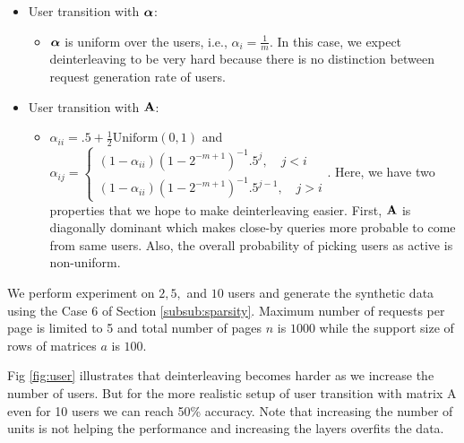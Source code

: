 	\begin{itemize}
		\item User transition with $\boldsymbol{\alpha}$:
		\begin{itemize}
			\item $\boldsymbol{\alpha}$ is uniform over the users, i.e., $\alpha_i = \frac{1}{m}$. In this case, we expect deinterleaving to be very hard because there is no distinction between request generation rate of users. 
		\end{itemize}
		\item User transition with $\mathbf{A}$:
		\begin{itemize}
			\item $\alpha_{ii} = .5 + \frac{1}{2} \text{Uniform}(0,1)$ and $\alpha_{ij} = 
			\begin{cases}
			(1 - \alpha_{ii}) (1 - 2^{-m+1})^{-1} .5^j,     \quad j < i \\
			(1 - \alpha_{ii}) (1 - 2^{-m+1})^{-1} .5^{j-1}, \quad j > i
			\end{cases} 
			$. 
			Here, we have two properties that we hope to make deinterleaving easier. 
			First, $\mathbf{A}$ is diagonally dominant which makes close-by queries more probable to come from same users. 
			Also, the overall probability of picking users as active is non-uniform. 
		\end{itemize}
	\end{itemize} 
	We perform experiment on $2, 5,$ and $10$ users and generate the synthetic data using the Case 6 of Section \ref{subsub:sparsity}. 
	Maximum number of requests per page is limited to 5 and total number of pages $n$ is $1000$ while the support size of rows of matrices $a$ is $100$. 

	
	Fig \ref{fig:user} illustrates that deinterleaving becomes harder as we increase the number of users. 
	But for the more realistic setup of user transition with matrix A even for 10 users we can reach 50\% accuracy.
	Note that increasing the number of units is not helping the performance and increasing the layers overfits the data. 
	
